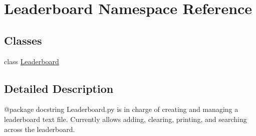 \hypertarget{namespace_leaderboard}{}\section{Leaderboard Namespace Reference}
\label{namespace_leaderboard}
\subsection*{Classes}
\begin{DoxyCompactItemize}
\item 
class \hyperlink{class_leaderboard_1_1_leaderboard}{Leaderboard}
\end{DoxyCompactItemize}


\subsection{Detailed Description}
\begin{DoxyVerb}@package docstring
Leaderboard.py is in charge of creating and managing a leaderboard text file. Currently allows adding, clearing, printing, and searching across the leaderboard.
\end{DoxyVerb}
 